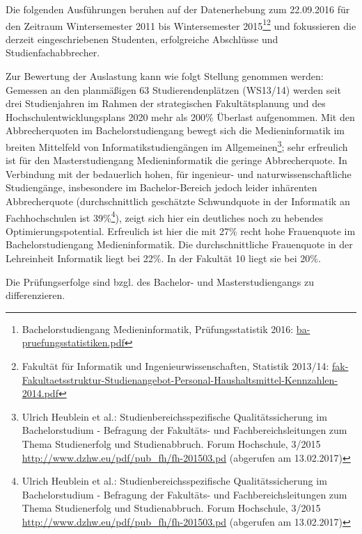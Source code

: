 Die folgenden Ausführungen beruhen auf der Datenerhebung zum 22.09.2016
für den Zeitraum Wintersemester 2011 bis Wintersemester 2015\footnote{Bachelorstudiengang
  Medieninformatik, Prüfungsstatistik 2016:
  \href{../anhaenge/ba-pruefungsstatistiken.pdf}{ba-pruefungsstatistiken.pdf}}\footnote{Fakultät
  für Informatik und Ingenieurwissenschaften, Statistik 2013/14:
  \href{../anhaenge/fak-Fakultaetsstruktur-Studienangebot-Personal-Haushaltsmittel-Kennzahlen-2014.pdf}{fak-Fakultaetsstruktur-Studienangebot-Personal-Haushaltsmittel-Kennzahlen-2014.pdf}}
und fokussieren die derzeit eingeschriebenen Studenten, erfolgreiche
Abschlüsse und Studienfachabbrecher.

Zur Bewertung der Auslastung kann wie folgt Stellung genommen werden:
Gemessen an den planmäßigen 63 Studierendenplätzen (WS13/14) werden seit
drei Studienjahren im Rahmen der strategischen Fakultätsplanung und des
Hochschulentwicklungsplans 2020 mehr als 200\% Überlast aufgenommen. Mit
den Abbrecherquoten im Bachelorstudiengang bewegt sich die
Medieninformatik im breiten Mittelfeld von Informatikstudiengängen im
Allgemeinen\footnote{Ulrich Heublein et al.: Studienbereichsspezifische
  Qualitätssicherung im Bachelorstudium - Befragung der Fakultäts- und
  Fachbereichsleitungen zum Thema Studienerfolg und Studienabbruch.
  Forum Hochschule, 3/2015
  \href{http://www.dzhw.eu/pdf/pub_fh/fh-201503.pdf}{http://www.dzhw.eu/pdf/pub\_fh/fh-201503.pd}
  (abgerufen am 13.02.2017)}; sehr erfreulich ist für den
Masterstudiengang Medieninformatik die geringe Abbrecherquote. In
Verbindung mit der bedauerlich hohen, für ingenieur- und
naturwissenschaftliche Studiengänge, insbesondere im Bachelor-Bereich
jedoch leider inhärenten Abbrecherquote (durchschnittlich geschätzte
Schwundquote in der Informatik an Fachhochschulen ist 39\%\footnote{Ulrich
  Heublein et al.: Studienbereichsspezifische Qualitätssicherung im
  Bachelorstudium - Befragung der Fakultäts- und Fachbereichsleitungen
  zum Thema Studienerfolg und Studienabbruch. Forum Hochschule, 3/2015
  \href{http://www.dzhw.eu/pdf/pub_fh/fh-201503.pdf}{http://www.dzhw.eu/pdf/pub\_fh/fh-201503.pd}
  (abgerufen am 13.02.2017)}), zeigt sich hier ein deutliches noch zu
hebendes Optimierungspotential. Erfreulich ist hier die mit 27\% recht
hohe Frauenquote im Bachelorstudiengang Medieninformatik. Die
durchschnittliche Frauenquote in der Lehreinheit Informatik liegt bei
22\%. In der Fakultät 10 liegt sie bei 20\%.

Die Prüfungserfolge sind bzgl. des Bachelor- und Masterstudiengangs zu
differenzieren.

